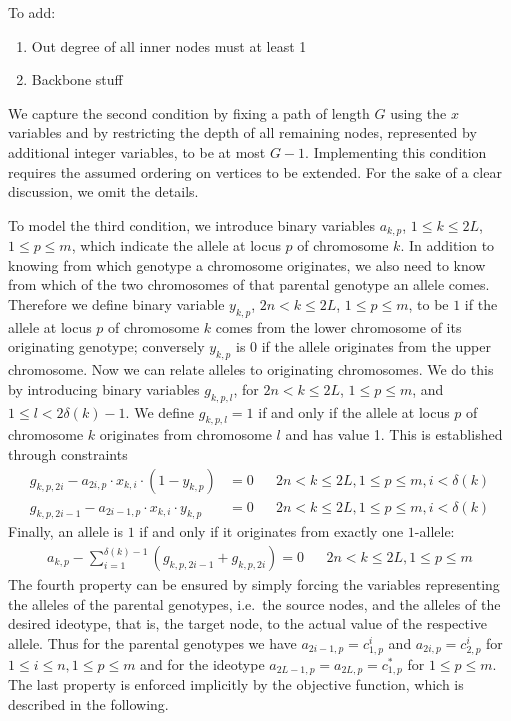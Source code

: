 \documentclass[runningheads]{llncs}
\begin{document}
To add:
\begin{enumerate}
  \item Out degree of all inner nodes must at least 1
  \item Backbone stuff
\end{enumerate}

We capture the second condition by fixing a path of length $G$ using the $x$ variables and by restricting the depth of all remaining nodes, represented by additional
integer variables, to be at most $G-1$. Implementing this condition requires the assumed ordering on vertices to be extended. For the sake of a clear discussion, we omit the details.

To model the third condition, we introduce 
binary variables $a_{k,p}$, $1 \leq k \leq 2L$, $1 \leq p \leq m$, which indicate the allele at locus $p$ of chromosome $k$. 
In addition to knowing from which genotype a chromosome originates, we also need to know from which of the two chromosomes of that 
parental genotype an allele comes. Therefore we define binary variable $y_{k,p}$, $2n < k \leq 2L$, $1 \leq p \leq m$, to be $1$ if the allele at locus $p$
of chromosome $k$ comes from the lower chromosome of its originating genotype;
conversely $y_{k,p}$ is $0$ if the allele originates from the upper chromosome.
Now we can relate alleles to originating chromosomes. We do this by introducing
binary variables $g_{k,p,l}$, for $2n < k \leq 2L$, $1 \leq p \leq m$, and $1 \leq l<2\delta(k)-1$.
We define $g_{k,p,l} = 1$ if and only if the allele at locus $p$ of chromosome
$k$ originates from chromosome $l$ and has value 1. This is established through constraints
\begin{align}
  \label{eq:ilp_g1}
  g_{k,p,2i} - a_{2i,p} \cdot x_{k,i} \cdot (1-y_{k,p}) & = 0 && 2n < k \leq 2L, 1 \leq p \leq m, i < \delta(k)\\
 \label{eq:ilp_g2}
  g_{k,p,2i-1}   - a_{2i-1,p} \cdot x_{k,i} \cdot y_{k,p} &= 0 && 2n < k \leq 2L, 1 \leq p \leq m, i < \delta(k)
\end{align}
Finally, an allele is $1$ if and only if it originates from exactly one $1$-allele:
\begin{align}
  \label{eq:ilp_g3}
   a_{k,p} - \sum_{i = 1}^{\delta(k) - 1} (g_{k,p,2i-1} + g_{k,p,2i}) = 0&& 2n < k \leq 2L, 1 \leq p \leq m
\end{align}
The fourth property can be ensured by simply forcing the variables representing the alleles of the parental genotypes, i.e.~the source nodes,
and the alleles of the desired ideotype, that is, the target node, to the actual value of the respective allele. Thus for the parental genotypes we have $a_{2i-1,p} = c^i_{1,p}$ and $a_{2i,p}  = c^i_{2,p}$ for $1 \leq i \leq n, 1 \leq p \leq m$
and for the ideotype $a_{2L-1,p} = a_{2L,p} = c^*_{1,p}$ for $1 \leq p \leq m$.
The last property is enforced implicitly by the objective function, which is described in the following. 
\end{document}
